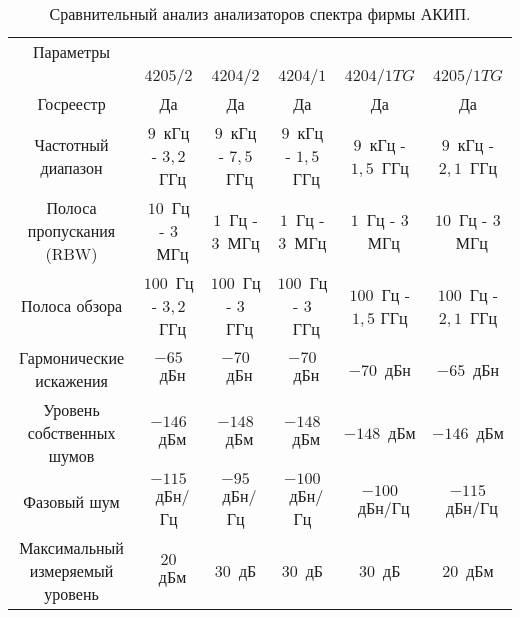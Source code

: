 \begin{table} [p]%
	\caption{Сравнительный анализ анализаторов спектра фирмы АКИП.}%
	\label{tbl:test7}%
	\begin{SingleSpace}
		\setlength\extrarowheight{6pt} %
		\setlength{\tymin}{1.7cm}%
		\begin{tabulary}{\textwidth}{@{}>{\zz}C >{\zz}C >{\zz}C >{\zz}C >{\zz}C >{\zz}C @{}}%
			\toprule     %
			Параметры &   \\
			
			&
			$4205/2$ &
			$4204/2$ &
			$4204/1$ &
			$4204/1 TG$ &
			$4205/1 TG$ \\
			
			\midrule %
			
			Госреестр &
			Да &
			Да &
			Да &
			Да &
			Да \\
			
			Частотный диапазон &
			$9$~кГц - $3,2$~ГГц & 
			$9$~кГц - $7,5$~ГГц &
			$9$~кГц - $1,5$~ГГц &
			$9$~кГц - $1,5$~ГГц &
			$9$~кГц - $2,1$~ГГц \\
			
			Полоса пропускания (RBW) &
			$10$~Гц - $3$~МГц &
			$1$~Гц - $3$~МГц &
			$1$~Гц - $3$~МГц &
			$1$~Гц - $3$~МГц &
			$10$~Гц - $3$~МГц \\
			
			Полоса обзора &	
			$100$~Гц - $3,2$~ГГц &
			$100$~Гц - $3$~ГГц &
			$100$~Гц - $3$~ГГц &
			$100$~Гц - $1,5$ ГГц &
			$100$~Гц - $2,1$~ГГц \\
			
			Гармонические искажения &
			$-65$~дБн &
			$-70$~дБн &
			$-70$~дБн &
			$-70$~дБн &
			$-65$~дБн \\
			
			Уровень собственных шумов &
			$-146$~дБм &
			$-148$~дБм &
			$-148$~дБм &
			$-148$~дБм &
			$-146$~дБм \\
			
			Фазовый шум   &
			$-115$~дБн/Гц &
			$-95$~дБн/Гц  &
			$-100$~дБн/Гц &
			$-100$~дБн/Гц &
			$-115$~дБн/Гц \\
			
			Максимальный измеряемый уровень &	
			$20$~дБм &
			$30$~дБ  &
			$30$~дБ  &
			$30$~дБ  &
			$20$~дБм \\

			\bottomrule %
		\end{tabulary}%
	\end{SingleSpace}
\end{table}

